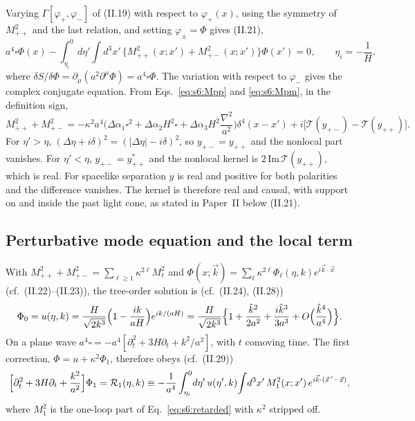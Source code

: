 \documentclass[aps,prd,onecolumn,10pt,nofootinbib,floatfix]{revtex4-2}
\newcommand{\PII}{Paper~II}
\newcommand{\eqII}[1]{(II.#1)}
\newcommand{\Tab}{\mathcal{T}}
\newcommand{\khat}{\hat k}
\begin{document}
Varying $\Gamma[\varphi_+,\varphi_-]$ of \eqII{19} with respect to $\varphi_+(x)$, using the symmetry of $M^2_{++}$ and
the last relation, and setting $\varphi_\pm=\Phi$ gives \eqII{21},
\begin{equation}
a^4\square\Phi(x)-\int_{\eta_i}^0d\eta'\!\int d^3x'\,\big\{M^2_{++}(x;x')+M^2_{+-}(x;x')\big\}\Phi(x')=0,
\qquad \eta_i=-\frac1H,
\label{eq:s6:effeq}
\end{equation}
where $\delta S/\delta\Phi=\partial_\mu(a^2\partial^\mu\Phi)=a^4\square\Phi$. The variation with respect to $\varphi_-$
gives the complex conjugate equation. From Eqs.~\eqref{eq:s6:Mpp} and \eqref{eq:s6:Mpm}, in the definition sign,
\begin{equation}
M^2_{++}+M^2_{+-}=-\kappa^2a^4\Big(\Delta\alpha_1\square^2+\Delta\alpha_2H^2\square+\Delta\alpha_3H^2\frac{\nabla^2}{a^2}\Big)
\delta^4(x-x')+i\big[\Tab(y_{+-})-\Tab(y_{++})\big].
\label{eq:s6:retarded}
\end{equation}
For $\eta'>\eta$, $(\Delta\eta+i\delta)^2=(|\Delta\eta|-i\delta)^2$, so $y_{+-}=y_{++}$ and the nonlocal part vanishes.
For $\eta'<\eta$, $y_{+-}=y_{++}^*$ and the nonlocal kernel is $2\,\mathrm{Im}\,\Tab(y_{++})$, which is real. For spacelike
separation $y$ is real and positive for both polarities and the difference vanishes. The kernel is therefore real and
causal, with support on and inside the past light cone, as stated in \PII{} below \eqII{21}.

\subsection{Perturbative mode equation and the local term}
\label{sec:s6:mode}

With $M^2_{++}+M^2_{+-}=\sum_{\ell\ge1}\kappa^{2\ell}M^2_\ell$ and $\Phi(x;\vec k)=\sum_\ell\kappa^{2\ell}\Phi_\ell(\eta,k)
e^{i\vec k\cdot\vec x}$ (cf.\ \eqII{22}--\eqII{23}), the tree-order solution is (cf.\ \eqII{24}, \eqII{28})
\begin{equation}
\Phi_0=u(\eta,k)=\frac{H}{\sqrt{2k^3}}\Big(1-\frac{ik}{aH}\Big)e^{ik/(aH)}
=\frac{H}{\sqrt{2k^3}}\Big\{1+\frac{\khat^2}{2a^2}+\frac{i\khat^3}{3a^3}+\sixO\Big(\frac{\khat^4}{a^4}\Big)\Big\}.
\label{eq:s6:u}
\end{equation}
On a plane wave $a^4\square=-a^4[\partial_t^2+3H\partial_t+k^2/a^2]$, with $t$ comoving time. The first correction,
$\Phi=u+\kappa^2\Phi_1$, therefore obeys (cf.\ \eqII{29})
\begin{equation}
\Big[\partial_t^2+3H\partial_t+\frac{k^2}{a^2}\Big]\Phi_1=\mathcal{R}_1(\eta,k)\equiv
-\frac1{a^4}\int_{\eta_i}^0\!d\eta'\,u(\eta',k)\!\int\!d^3x'\,M^2_1(x;x')\,e^{i\vec k\cdot(\vec x\,'-\vec x)},
\label{eq:s6:mode}
\end{equation}
where $M^2_1$ is the one-loop part of Eq.~\eqref{eq:s6:retarded} with $\kappa^2$ stripped off.
\end{document}
